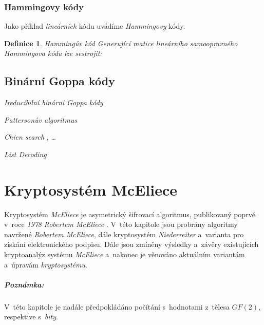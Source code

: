 \documentclass[thesis=M,czech,hidelinks]{FITthesis}[2012/06/26]
\newcommand{\0}{{\textcolor[gray]{0.80}{0}}}
\newtheorem{definice}{Definice}
\begin{document}
\subsection{Hammingovy kódy}
Jako příklad \emph{lineárních} kódu uvádíme \emph{Hammingovy} kódy.

\begin{definice}{Hammingův kód}
    Generující matice \emph{lineárního samoopravného Hammingova} kódu lze
    sestrojit:

\end{definice}

\section{Binární Goppa kódy}\label{kap_goppa_kody}
\cite{Goppa,Berlekamp2}

\emph{Ireducibilní binární Goppa kódy}

\emph{Pattersonův algoritmus}
\cite{Patterson}

\emph{Chien search} , \ldots

\emph{List Decoding}  \cite{Repka,Bernstein2}




\chapter{Kryptosystém McEliece}\label{kap_mceliece}

Kryptosystém \emph{McEliece} je asymetrický šifrovací algoritmus, publikovaný
poprvé v~roce \emph{1978} \emph{Robertem McEliece} \cite{McEliece}. V~této
kapitole jsou probrány algoritmy navržené \emph{Robertem McEliece}, dále
kryptosystém \emph{Niederreiter} a~varianta pro získání elektronického podpisu.
Dále jsou zmíněny výsledky a~závěry existujících kryptoanalýz systému
\emph{McEliece} a~nakonec je věnováno aktuálním variantám a~úpravám
\emph{kryptosystému}.

\paragraph{Poznámka:} V~této kapitole je nadále předpokládáno počítání
s~hodnotami z~tělesa $GF(2)$, respektive s~\emph{bity}.
\end{document}
